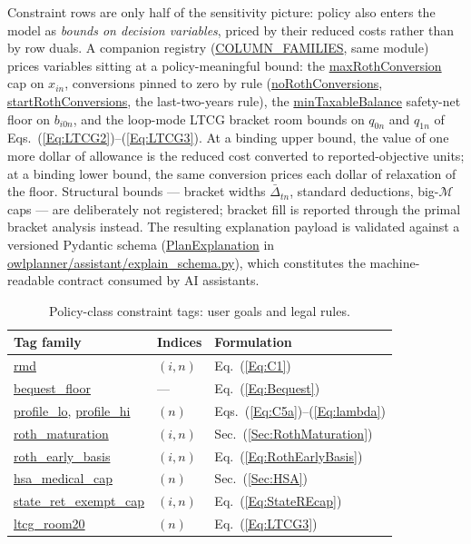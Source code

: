 \documentclass[fleqn,12pt]{report}
\newcommand{\code}[1]{\url{#1}}
\begin{document}
Constraint rows are only half of the sensitivity picture: policy also enters
the model as \emph{bounds on decision variables}, priced by their reduced
costs rather than by row duals.
A companion registry (\code{COLUMN_FAMILIES}, same module) prices variables
sitting at a policy-meaningful bound: the \code{maxRothConversion} cap on
$x_{in}$, conversions pinned to zero by rule (\code{noRothConversions},
\code{startRothConversions}, the last-two-years rule), the
\code{minTaxableBalance} safety-net floor on
$b_{i0n}$, and the loop-mode LTCG bracket room bounds on $q_{0n}$ and
$q_{1n}$ of Eqs.~(\ref{Eq:LTCG2})--(\ref{Eq:LTCG3}).
At a binding upper bound, the value of one more dollar of allowance is the
reduced cost converted to reported-objective units; at a binding lower bound,
the same conversion prices each dollar of relaxation of the floor.
Structural bounds --- bracket widths $\bar{\Delta}_{tn}$, standard deductions,
big-$\mathcal{M}$ caps --- are deliberately not registered; bracket fill is
reported through the primal bracket analysis instead.
The resulting explanation payload is validated against a versioned Pydantic
schema (\code{PlanExplanation} in
\code{owlplanner/assistant/explain_schema.py}), which constitutes the
machine-readable contract consumed by AI assistants.

\begin{table}[hbt!]
\centering\small
\begin{tabular}{lll}
\hline
Tag family & Indices & Formulation \\
\hline
\code{rmd} & $(i,n)$ & Eq.~(\ref{Eq:C1}) \\
\code{bequest_floor} & --- & Eq.~(\ref{Eq:Bequest}) \\
\code{profile_lo}, \code{profile_hi} & $(n)$ & Eqs.~(\ref{Eq:C5a})--(\ref{Eq:lambda}) \\
\code{roth_maturation} & $(i,n)$ & Sec.~(\ref{Sec:RothMaturation}) \\
\code{roth_early_basis} & $(i,n)$ & Eq.~(\ref{Eq:RothEarlyBasis}) \\
\code{hsa_medical_cap} & $(n)$ & Sec.~(\ref{Sec:HSA}) \\
\code{state_ret_exempt_cap} & $(i,n)$ & Eq.~(\ref{Eq:StateREcap}) \\
\code{ltcg_room20} & $(n)$ & Eq.~(\ref{Eq:LTCG3}) \\
\hline
\end{tabular}
\caption{Policy-class constraint tags: user goals and legal rules.}
\label{Tab:TagsPolicy}
\end{table}
\end{document}

